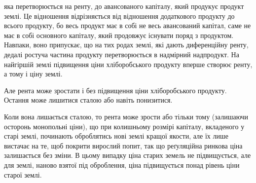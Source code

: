 \parcont{}  %
яка перетворюється на ренту, до авансованого капіталу, який продукує продукт
землі. Це відношення відрізняється від відношення додаткового продукту до
всього продукту, бо весь продукт має в собі не весь авансований капітал, саме
не має в собі основного капіталу, який продовжує існувати поряд з продуктом.
Навпаки, воно припускає, що на тих родах землі, які дають диференційну
ренту, дедалі ростуча частина продукту перетворюється в надмірний  надпродукт.
На найгіршій землі підвищення ціни хліборобського продукту вперше створює
ренту, а тому і ціну землі.

Але рента може зростати і без підвищення ціни хліборобського продукту.
Остання може лишитися сталою або навіть понизитися.

Коли вона лишається сталою, то рента може зрости або тільки тому
(залишаючи осторонь монопольні ціни), що при колишньому розмірі капіталу,
вкладеного у старі землі, починають оброблятись нові землі кращої якости, але
їх лише вистачає на те, щоб покрити вирослий попит, так що реґуляційна
ринкова ціна залишається без зміни. В цьому випадку ціна старих земель не
підвищується, але для землі, наново взятої під оброблення, ціна підвищується
понад рівень ціни старої землі.

